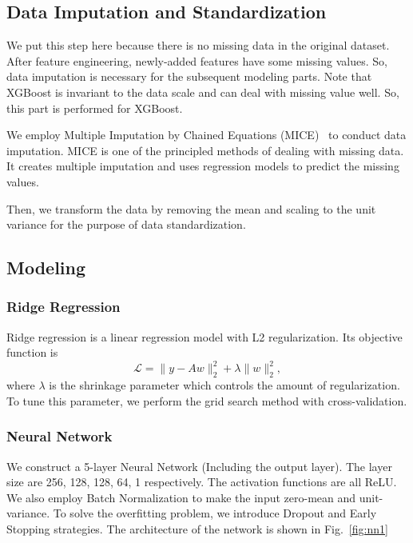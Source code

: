 \subsection{Data Imputation and Standardization}
We put this step here because there is no missing data in the original dataset. After feature engineering, newly-added features have some missing values. So, data imputation is necessary for the subsequent modeling parts. Note that XGBoost is invariant to the data scale and can deal with missing value well. So, this part is performed for XGBoost.

We employ Multiple Imputation by Chained Equations (MICE)~\cite{azur2011multiple} to conduct data imputation. MICE is one of the principled methods of dealing with missing data. It creates multiple imputation and uses regression models to predict the missing values.

Then, we transform the data by removing the mean and scaling to the unit variance for the purpose of data standardization.
\subsection{Modeling}
\subsubsection{Ridge Regression}
Ridge regression is a linear regression model with L2 regularization. Its objective function is
\begin{equation}
\mathcal{L} = \|y - Aw\|_2^2 + \lambda \|w\|^2_2,
\end{equation}
where $\lambda$ is the shrinkage parameter which controls the amount of regularization. To tune this parameter, we perform the grid search method with cross-validation.

\subsubsection{Neural Network}
We construct a 5-layer Neural Network (Including the output layer). The layer size are 256, 128, 128, 64, 1 respectively. The activation functions are all ReLU. We also employ Batch Normalization to make the input zero-mean and unit-variance. To solve the overfitting problem, we introduce Dropout and Early Stopping strategies. The architecture of the network is shown in Fig.~\ref{fig:nn1}

